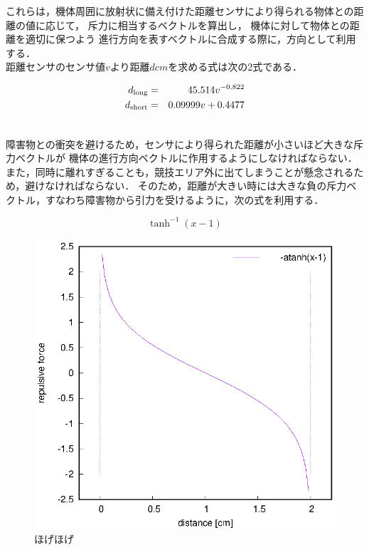 \documentclass[11pt,a4paper]{jsarticle}
\begin{document}
  これらは，機体周囲に放射状に備え付けた距離センサにより得られる物体との距離の値に応じて，
  斥力に相当するベクトルを算出し，
  機体に対して物体との距離を適切に保つよう
  進行方向を表すベクトルに合成する際に，方向として利用する．\\

  距離センサのセンサ値$v$より距離$d \unit{cm}$を求める式は次の2式である．

  \begin{eqnarray}
    d_{\rm{ long}} &=& 45.514 v^{-0.822} \\
    d_{\rm{short}} &=& 0.09999 v + 0.4477 \\ \nonumber
  \end{eqnarray}

  障害物との衝突を避けるため，センサにより得られた距離が小さいほど大きな斥力ベクトルが
  機体の進行方向ベクトルに作用するようにしなければならない．
  また，同時に離れすぎることも，競技エリア外に出てしまうことが懸念されるため，避けなければならない．
  そのため，距離が大きい時には大きな負の斥力ベクトル，すなわち障害物から引力を受けるように，次の式を利用する．

  \begin{equation}
    \tanh^{-1}(x-1)
  \end{equation}

  \begin{figure}[b]
    \begin{center}
      \includegraphics[width=1.0\hsize]{plot/minus_atanh.eps}
    \end{center}
    \caption{ほげほげ}
    \label{fig::atanh}
  \end{figure}
\end{document}
